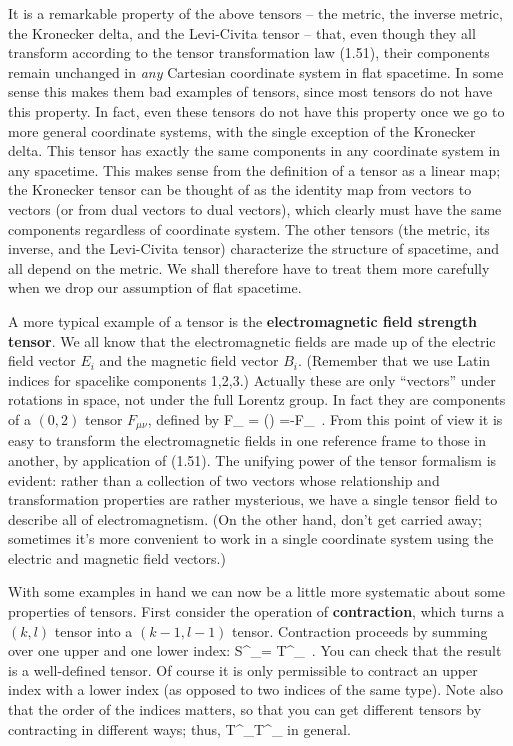 \documentclass[12pt]{article}
\begin{document}
It is a remarkable property of the above tensors -- the metric, the inverse
metric, the Kronecker delta, and the Levi-Civita tensor -- that, even though
they all transform according to the tensor transformation law (1.51), their
components remain unchanged in {\it any} Cartesian coordinate system in
flat spacetime.  In some sense this makes them bad examples of tensors, since
most tensors do not have this property.  In fact, even these tensors do not
have this property once we go to more general coordinate systems, with the
single exception of the Kronecker delta.  This tensor has exactly the same
components in any coordinate system in any spacetime.  This makes sense
from the definition of a tensor as a linear map; the Kronecker tensor can
be thought of as the identity map from vectors to vectors (or from dual
vectors to dual vectors), which clearly must have the same components
regardless of coordinate system.  The other tensors (the metric, its inverse,
and the Levi-Civita tensor) characterize the structure of spacetime, and
all depend on the metric.  We shall therefore have to treat them more
carefully when we drop our assumption of flat spacetime.

A more typical example of a tensor is the {\bf electromagnetic field
strength tensor}.  We all know that the electromagnetic fields are made up
of the electric field vector $E_i$ and the magnetic field vector $B_i$.
(Remember that we use Latin indices for spacelike components 1,2,3.)
Actually these are only ``vectors'' under rotations in space, not under
the full Lorentz group.  In fact they are components of a $(0,2)$
tensor $F_{\mu\nu}$, defined by
\be
  F_{\mu\nu} = \left(\right)
  =-F_{\nu\mu}\ .\label{1.58}
\ee
From this point of view it is easy to transform the electromagnetic
fields in one reference frame to those in another, by application of (1.51).
The unifying power of the tensor formalism is evident: rather than a
collection of two vectors whose relationship and transformation
properties are rather mysterious, we have a single tensor field to
describe all of electromagnetism.  (On the other hand, don't get 
carried away; sometimes it's more convenient to work in a single
coordinate system using the electric and magnetic field vectors.)

With some examples in hand we can now be a little more systematic 
about some properties of tensors.  First consider the operation of
{\bf contraction}, which turns a $(k,l)$ tensor into a $(k-1,l-1)$
tensor.  Contraction proceeds by summing over one upper and one lower
index:
\be
  S^{\mu\rho}{}_\sigma = T^{\mu\nu\rho}{}_{\sigma\nu}\ .\label{1.59}
\ee
You can check that the result is a well-defined tensor.  Of course it
is only permissible to contract an upper index with a lower index (as
opposed to two indices of the same type).  Note also that the order
of the indices matters, so that you can get different tensors by
contracting in different ways; thus,
\be
  T^{\mu\nu\rho}{}_{\sigma\nu}\neq T^{\mu\rho\nu}{}_{\sigma\nu}
  \label{1.60}
\ee
in general.
\end{document}
